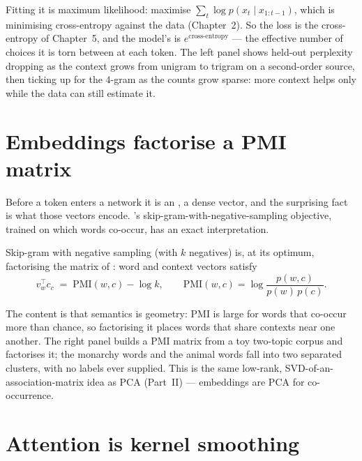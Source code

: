 \documentclass[11pt]{article}
\begin{document}
Fitting it is maximum likelihood: maximise $\sum_t \log p(x_t\mid x_{1:t-1})$,
which is minimising cross-entropy against the data (Chapter~2). So the loss is the
cross-entropy of Chapter~5, and the model's  is
$e^{\text{cross-entropy}}$ --- the effective number of choices it is torn between
at each token. The left panel shows held-out perplexity dropping as the context
grows from unigram to trigram on a second-order source, then ticking up for the
$4$-gram as the counts grow sparse: more context helps only while the data can
still estimate it.

\section{Embeddings factorise a PMI matrix}

Before a token enters a network it is an , a dense vector, and
the surprising fact is what those vectors encode. 's
skip-gram-with-negative-sampling objective, trained on which words co-occur, has
an exact interpretation.

\begin{theorem}
Skip-gram with negative sampling (with $k$ negatives) is, at its optimum,
factorising the matrix of :
word and context vectors satisfy
\[
  v_w^\top c_c \;=\; \mathrm{PMI}(w,c) - \log k,
  \qquad \mathrm{PMI}(w,c)=\log\frac{p(w,c)}{p(w)\,p(c)} .
\]
\end{theorem}

The content is that semantics is geometry: PMI is large for words that co-occur
more than chance, so factorising it places words that share contexts near one
another. The right panel builds a PMI matrix from a toy two-topic corpus and
factorises it; the monarchy words and the animal words fall into two separated
clusters, with no labels ever supplied. This is the same low-rank,
SVD-of-an-association-matrix idea as PCA (Part~II) --- embeddings are PCA for
co-occurrence.

\section{Attention is kernel smoothing}
\end{document}
